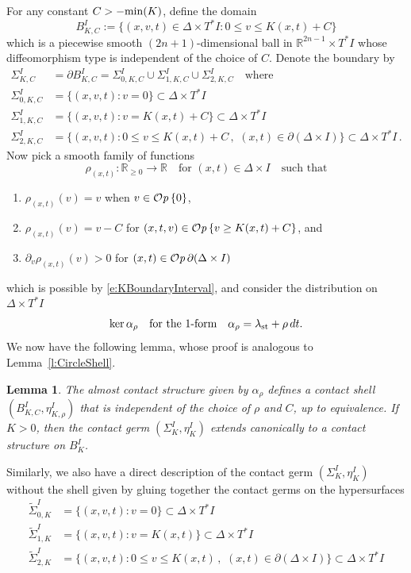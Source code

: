 \documentclass[12pt]{paper}
\theoremstyle{plain}
\newtheorem{lemma}[theorem]{Lemma}
\theoremstyle{definition}
\newcommand{\p}{\partial}
\newcommand{\R}{{\mathbb{R}}}
\newcommand{\st}{{\rm st}}
\renewcommand{\min}{{\rm min}}
\def\Op{{\mathcal O}{\it p}\,}
\numberwithin{figure}{section}
\begin{document}
For any constant $C > - \min(K)$, define the domain
$$
	B_{K,C}^{I} := \{(x,v,t) \in \Delta \times T^*I : 0 \leq v \leq K(x,t)+C\}
$$
which is a piecewise smooth $(2n+1)$-dimensional ball in $\R^{2n-1} \times T^*I$
whose diffeomorphism type is independent of the choice of $C$.
Denote the boundary by
\begin{align*}
	\Sigma_{K,C}^{I} &= \p B_{K,C}^{I} = \Sigma_{0,K,C}^I \cup \Sigma_{1,K,C}^I \cup \Sigma_{2,K,C}^I \quad\mbox{where}\\
	\Sigma_{0,K,C}^I &= \{(x,v,t): v = 0\} \subset \Delta \times T^*I\\
	\Sigma_{1,K,C}^I &= \{(x,v,t): v = K(x,t)+C\} \subset \Delta \times T^*I\\
	\Sigma_{2,K,C}^I &= \{(x,v,t): 0 \leq v \leq K(x,t)+C\,,\,\, (x,t) \in \p(\Delta \times I) \} \subset \Delta \times T^*I\,.
\end{align*}
Now pick a smooth family of functions
\begin{equation}\label{e:FamilyRhoI}
	\rho_{(x,t)}: \R_{\geq 0} \to \R \quad\mbox{for $(x,t) \in \Delta \times I$} \quad\mbox{such that}
\end{equation}
\begin{enumerate}
\item $\rho_{(x,t)}(v) = v$ when $v \in \Op \{0\}$,
\item $\rho_{(x,t)}(v) = v - C$ for $(x,t,v) \in \Op\{v \geq K(x,t) +C\}$, and
\item $\p_v \rho_{(x,t)}(v) > 0$ for $(x,t) \in \Op \p(\Delta \times I)$
\end{enumerate}
which is possible by \eqref{e:KBoundaryInterval}, and consider the distribution on $\Delta \times T^*I$
$$
	\ker \alpha_\rho \quad\mbox{for the $1$-form}\quad
	\alpha_\rho = \lambda_{\st} + \rho\,dt. 
$$
We now have the following lemma, whose proof is analogous to Lemma~\ref{l:CircleShell}.
\begin{lemma}
	The almost contact structure given by $\alpha_\rho$ defines a contact shell
	$(B^{I}_{K,C}, \eta_{K,\rho}^{I})$ that is independent of
	the choice of $\rho$ and $C$, up to equivalence.
	If $K > 0$, then the contact germ $(\Sigma^{I}_K, \eta_K^{I})$ extends
	canonically to a contact structure on $B^{I}_K$.
\end{lemma}
Similarly, we also have a direct description of the contact germ $(\Sigma_K^{I}, \eta_K^{I})$ without the shell
given by gluing together the contact germs on the hypersurfaces
\begin{align*}
	\tilde\Sigma_{0,K}^I &= \{(x,v,t): v = 0\} \subset \Delta \times T^*I\\
	\tilde\Sigma_{1,K}^I &= \{(x,v,t): v = K(x,t)\} \subset \Delta \times T^*I\\
	\tilde\Sigma_{2,K}^I &= \{(x,v,t): 0 \leq v \leq K(x,t)\,,\,\, (x,t) \in \p(\Delta \times I) \} \subset \Delta \times T^*I
\end{align*}
\end{document}

